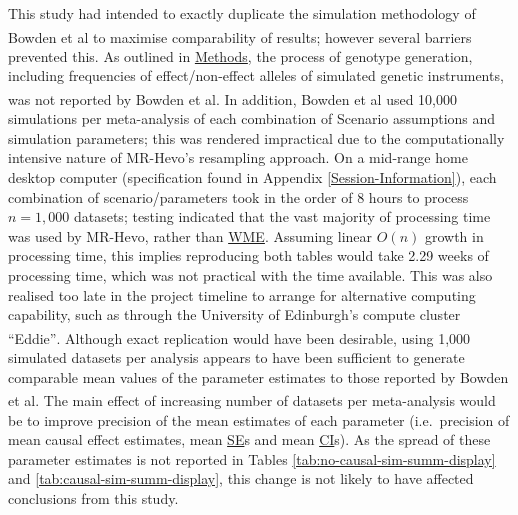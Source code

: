 \documentclass[
]{article}
\begin{document}
This study had intended to exactly duplicate the simulation methodology of Bowden et al\textsuperscript{} to maximise comparability of results; however several barriers prevented this. As outlined in \hyperref[methods]{Methods}, the process of genotype generation, including frequencies of effect/non-effect alleles of simulated genetic instruments, was not reported by Bowden et al\textsuperscript{}. In addition, Bowden et al used 10,000 simulations per meta-analysis of each combination of Scenario assumptions and simulation parameters; this was rendered impractical due to the computationally intensive nature of MR-Hevo's resampling approach. On a mid-range home desktop computer (specification found in Appendix \ref{Session-Information}), each combination of scenario/parameters took in the order of 8 hours to process \(n = 1,000\) datasets; testing indicated that the vast majority of processing time was used by MR-Hevo, rather than \hyperref[acronyms_WME]{WME}. Assuming linear \(O(n)\) growth in processing time, this implies reproducing both tables would take 2.29 weeks of processing time, which was not practical with the time available. This was also realised too late in the project timeline to arrange for alternative computing capability, such as through the University of Edinburgh's compute cluster ``Eddie''\textsuperscript{}. Although exact replication would have been desirable, using 1,000 simulated datasets per analysis appears to have been sufficient to generate comparable mean values of the parameter estimates to those reported by Bowden et al\textsuperscript{}. The main effect of increasing number of datasets per meta-analysis would be to improve precision of the mean estimates of each parameter (i.e.~precision of mean causal effect estimates, mean \hyperref[acronyms_SE]{SE}s and mean \hyperref[acronyms_CI]{CI}s). As the spread of these parameter estimates is not reported in Tables \ref{tab:no-causal-sim-summ-display} and \ref{tab:causal-sim-summ-display}, this change is not likely to have affected conclusions from this study.
\end{document}
